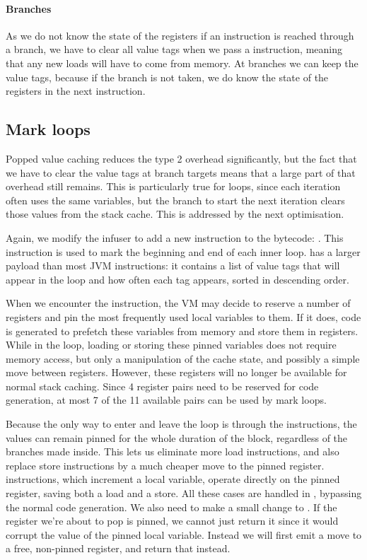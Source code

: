 \paragraph{Branches} As we do not know the state of the registers if an instruction is reached through a branch, we have to clear all value tags when we pass a  instruction, meaning that any new loads will have to come from memory. At branches we can keep the value tags, because if the branch is not taken, we do know the state of the registers in the next instruction.

\subsection{Mark loops}
\label{sec-optimisation-markloops}

Popped value caching reduces the type 2 overhead significantly, but the fact that we have to clear the value tags at branch targets means that a large part of that overhead still remains. This is particularly true for loops, since each iteration often uses the same variables, but the branch to start the next iteration clears those values from the stack cache. This is addressed by the next optimisation.

Again, we modify the infuser to add a new instruction to the bytecode: . This instruction is used to mark the beginning and end of each inner loop.  has a larger payload than most JVM instructions: it contains a list of value tags that will appear in the loop and how often each tag appears, sorted in descending order.

When we encounter the  instruction, the VM may decide to reserve a number of registers and pin the most frequently used local variables to them. If it does, code is generated to prefetch these variables from memory and store them in registers. While in the loop, loading or storing these pinned variables does not require memory access, but only a manipulation of the cache state, and possibly a simple move between registers. However, these registers will no longer be available for normal stack caching. Since 4 register pairs need to be reserved for code generation, at most 7 of the 11 available pairs can be used by mark loops.

Because the only way to enter and leave the loop is through the  instructions, the values can remain pinned for the whole duration of the block, regardless of the branches made inside. This lets us eliminate more load instructions, and also replace store instructions by a much cheaper move to the pinned register.  instructions, which increment a local variable, operate directly on the pinned register, saving both a load and a store. All these cases are handled in , bypassing the normal code generation. We also need to make a small change to . If the register we're about to pop is pinned, we cannot just return it since it would corrupt the value of the pinned local variable. Instead we will first emit a move to a free, non-pinned register, and return that instead.

